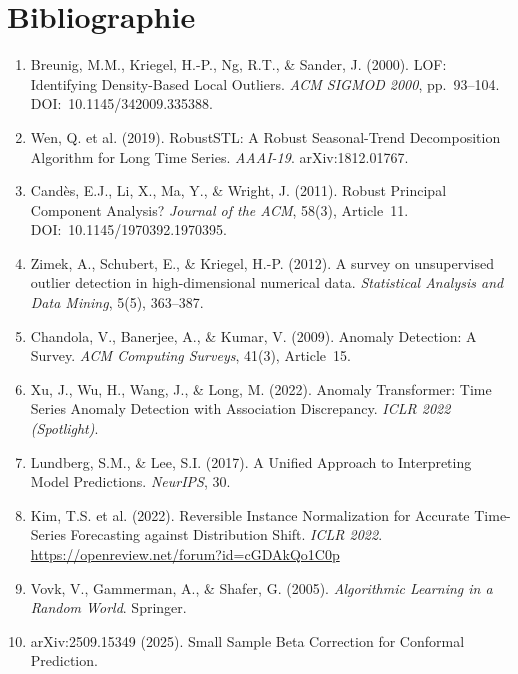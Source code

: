 \documentclass[12pt,a4paper]{article}
\begin{document}
\section*{Bibliographie}

\begin{enumerate}

\item Breunig, M.M., Kriegel, H.-P., Ng, R.T., \& Sander, J. (2000).
LOF: Identifying Density-Based Local Outliers. \textit{ACM SIGMOD 2000},
pp.~93--104. DOI:~10.1145/342009.335388.

\item Wen, Q. et al. (2019). RobustSTL: A Robust Seasonal-Trend
Decomposition Algorithm for Long Time Series. \textit{AAAI-19}.
arXiv:1812.01767.

\item Candès, E.J., Li, X., Ma, Y., \& Wright, J. (2011). Robust Principal
Component Analysis? \textit{Journal of the ACM}, 58(3), Article~11.
DOI:~10.1145/1970392.1970395.

\item Zimek, A., Schubert, E., \& Kriegel, H.-P. (2012). A survey on
unsupervised outlier detection in high-dimensional numerical data.
\textit{Statistical Analysis and Data Mining}, 5(5), 363--387.

\item Chandola, V., Banerjee, A., \& Kumar, V. (2009). Anomaly Detection:
A Survey. \textit{ACM Computing Surveys}, 41(3), Article~15.

\item Xu, J., Wu, H., Wang, J., \& Long, M. (2022). Anomaly Transformer:
Time Series Anomaly Detection with Association Discrepancy.
\textit{ICLR 2022 (Spotlight)}.

\item Lundberg, S.M., \& Lee, S.I. (2017). A Unified Approach to
Interpreting Model Predictions. \textit{NeurIPS}, 30.

\item Kim, T.S. et al. (2022). Reversible Instance Normalization for
Accurate Time-Series Forecasting against Distribution Shift.
\textit{ICLR 2022}.
\url{https://openreview.net/forum?id=cGDAkQo1C0p}

\item Vovk, V., Gammerman, A., \& Shafer, G. (2005).
\textit{Algorithmic Learning in a Random World}. Springer.

\item arXiv:2509.15349 (2025). Small Sample Beta Correction for Conformal
Prediction.


\end{enumerate}
\end{document}
